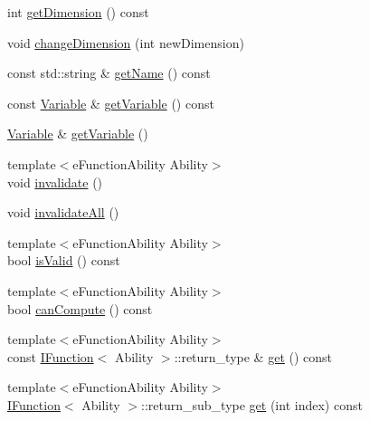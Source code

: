 \begin{DoxyCompactItemize}
\item 
int \hyperlink{structocra_1_1FunctionInterfaceMapping_3_01X_3_01Function_01_4_01_4_aa9a3b67499ae7d460a55a83aa3731c73}{get\+Dimension} () const
\item 
void \hyperlink{structocra_1_1FunctionInterfaceMapping_3_01X_3_01Function_01_4_01_4_aebf253ed862abb394f5586709002252e}{change\+Dimension} (int new\+Dimension)
\item 
const std\+::string \& \hyperlink{structocra_1_1FunctionInterfaceMapping_3_01X_3_01Function_01_4_01_4_af2bb88848088abbb7ddb9dccb267fd0d}{get\+Name} () const
\item 
const \hyperlink{classocra_1_1Variable}{Variable} \& \hyperlink{structocra_1_1FunctionInterfaceMapping_3_01X_3_01Function_01_4_01_4_a9058e43e7454b244cb55433205ecc163}{get\+Variable} () const
\item 
\hyperlink{classocra_1_1Variable}{Variable} \& \hyperlink{structocra_1_1FunctionInterfaceMapping_3_01X_3_01Function_01_4_01_4_a799447e899dab515b46d322223e8b2cf}{get\+Variable} ()
\item 
{\footnotesize template$<$e\+Function\+Ability Ability$>$ }\\void \hyperlink{structocra_1_1FunctionInterfaceMapping_3_01X_3_01Function_01_4_01_4_ac4e31f7faf096831c52691ef361054b1}{invalidate} ()
\item 
void \hyperlink{structocra_1_1FunctionInterfaceMapping_3_01X_3_01Function_01_4_01_4_a1c8b1fac294850b4b70641761acc2542}{invalidate\+All} ()
\item 
{\footnotesize template$<$e\+Function\+Ability Ability$>$ }\\bool \hyperlink{structocra_1_1FunctionInterfaceMapping_3_01X_3_01Function_01_4_01_4_af951c325ee8497589c3f79b9fcdf003e}{is\+Valid} () const
\item 
{\footnotesize template$<$e\+Function\+Ability Ability$>$ }\\bool \hyperlink{structocra_1_1FunctionInterfaceMapping_3_01X_3_01Function_01_4_01_4_a0e4d65bb9b0548cf131585fcb1a2a17f}{can\+Compute} () const
\item 
{\footnotesize template$<$e\+Function\+Ability Ability$>$ }\\const \hyperlink{classocra_1_1IFunction}{I\+Function}$<$ Ability $>$\+::return\+\_\+type \& \hyperlink{structocra_1_1FunctionInterfaceMapping_3_01X_3_01Function_01_4_01_4_af42a6175afbf22787ab4dd7dab5b0152}{get} () const
\item 
{\footnotesize template$<$e\+Function\+Ability Ability$>$ }\\\hyperlink{classocra_1_1IFunction}{I\+Function}$<$ Ability $>$\+::return\+\_\+sub\+\_\+type \hyperlink{structocra_1_1FunctionInterfaceMapping_3_01X_3_01Function_01_4_01_4_a6212b1a19d132697be6950665075208e}{get} (int index) const

\end{DoxyCompactItemize}
